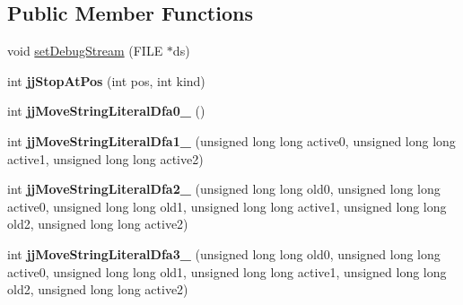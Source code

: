 \subsection*{Public Member Functions}
\begin{DoxyCompactItemize}
\item 
void \mbox{\hyperlink{classvhdl_1_1parser_1_1_vhdl_parser_token_manager_a5e2cb39e044c789dafdff268ceb6957c}{set\+Debug\+Stream}} (F\+I\+LE $\ast$ds)
\item 
\mbox{\label{classvhdl_1_1parser_1_1_vhdl_parser_token_manager_ad355ab4302c01a5cc400d280642b693b}} 
int {\bfseries jj\+Stop\+At\+Pos} (int pos, int kind)
\item 
\mbox{\label{classvhdl_1_1parser_1_1_vhdl_parser_token_manager_a2799317f4ebaa48cd6abaeddc2bb13b8}} 
int {\bfseries jj\+Move\+String\+Literal\+Dfa0\+\_} ()
\item 
\mbox{\label{classvhdl_1_1parser_1_1_vhdl_parser_token_manager_a9770d39c8b674e338c697509e4133800}} 
int {\bfseries jj\+Move\+String\+Literal\+Dfa1\+\_} (unsigned long long active0, unsigned long long active1, unsigned long long active2)
\item 
\mbox{\label{classvhdl_1_1parser_1_1_vhdl_parser_token_manager_a7b4829266370d7434407890aece710f7}} 
int {\bfseries jj\+Move\+String\+Literal\+Dfa2\+\_} (unsigned long long old0, unsigned long long active0, unsigned long long old1, unsigned long long active1, unsigned long long old2, unsigned long long active2)
\item 
\mbox{\label{classvhdl_1_1parser_1_1_vhdl_parser_token_manager_a57f85ceff69584e5294c367739b24813}} 
int {\bfseries jj\+Move\+String\+Literal\+Dfa3\+\_} (unsigned long long old0, unsigned long long active0, unsigned long long old1, unsigned long long active1, unsigned long long old2, unsigned long long active2)
\item 
\mbox{\label{classvhdl_1_1parser_1_1_vhdl_parser_token_manager_a3cfe7491719c522f77988019b7ee20c5}} 

\end{DoxyCompactItemize}
